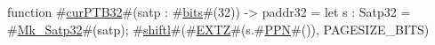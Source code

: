 function #\hyperref[sailRISCVzcurPTB32]{curPTB32}#(satp : #\hyperref[sailRISCVzbits]{bits}#(32)) -> paddr32 = {
  let s : Satp32 = #\hyperref[sailRISCVzMkzySatp32]{Mk\_Satp32}#(satp);
  #\hyperref[sailRISCVzshiftl]{shiftl}#(#\hyperref[sailRISCVzEXTZ]{EXTZ}#(s.#\hyperref[sailRISCVzPPN]{PPN}#()), PAGESIZE_BITS)
}
